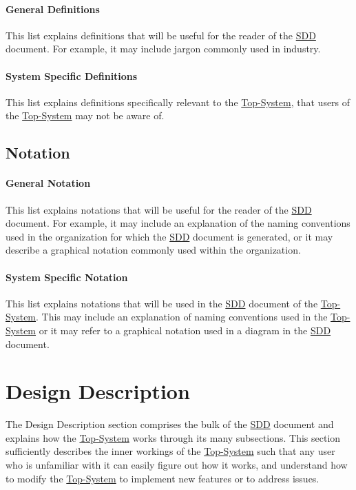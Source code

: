 \documentclass{mcscert}
\newcommand{\topsystemnolink}{Top-System} %
\newcommand{\topsystem}{\hyperref[def:topsystem]{\topsystemnolink{}}}
\begin{document}
\paragraph*{General Definitions}
\label{par:def-gen-description}
This list explains definitions that will be useful for the reader of the \hyperref[acr:sdd]{SDD} document. 
For example, it may include jargon commonly used in industry.

\paragraph*{System Specific Definitions}
\label{par:def-sys-spec-description}
This list\label{itm:sys-defs} explains definitions specifically relevant to the \topsystem{}, that users of the \topsystem{} may not be aware of.

\subsection{Notation}
\label{ssec:not-description}

\paragraph*{General Notation}
\label{par:not-gen-description}
This list explains notations that will be useful for the reader of the \hyperref[acr:sdd]{SDD} document. 
For example, it may include an explanation of the naming conventions used in the organization for which the \hyperref[acr:sdd]{SDD} document is generated, or it may describe a graphical notation commonly used within the organization.

\paragraph*{System Specific Notation} \label{par:not-sys-spec-description}
This list\label{itm:sys-not} explains notations that will be used in the \hyperref[acr:sdd]{SDD} document of the \topsystem{}. 
This may include an explanation of naming conventions used in the \topsystem{} or it may refer to a graphical notation used in a diagram in the \hyperref[acr:sdd]{SDD} document. 

\section{Design Description} 
\label{sec:des-desc}
The Design Description section comprises the bulk of the \hyperref[acr:sdd]{SDD} document and explains how the \topsystem{} works through its many subsections. 
This section sufficiently describes the inner workings of the \topsystem{} such that any user who is unfamiliar with it can easily figure out how it works, and understand how to modify the \topsystem{} to implement new features or to address issues.
\end{document}

